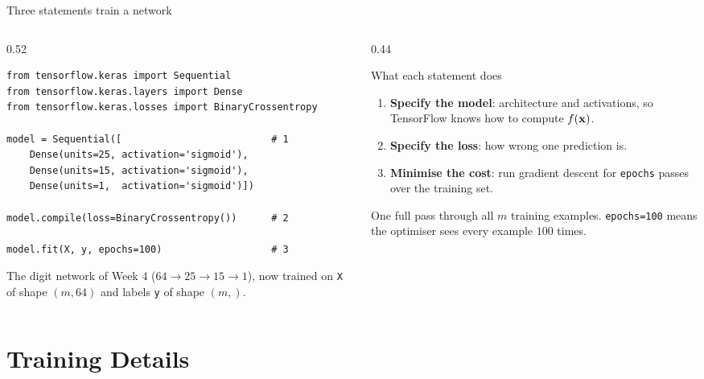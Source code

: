 \documentclass[aspectratio=169,10pt]{beamer}
\begin{document}
\begin{frame}[fragile]{Three statements train a network}
  \begin{columns}[T,onlytextwidth]
    \begin{column}{0.52\textwidth}
\begin{lstlisting}
from tensorflow.keras import Sequential
from tensorflow.keras.layers import Dense
from tensorflow.keras.losses import BinaryCrossentropy

model = Sequential([                          # 1
    Dense(units=25, activation='sigmoid'),
    Dense(units=15, activation='sigmoid'),
    Dense(units=1,  activation='sigmoid')])

model.compile(loss=BinaryCrossentropy())      # 2

model.fit(X, y, epochs=100)                   # 3
\end{lstlisting}
      \vspace{1mm}
      \footnotesize
      The digit network of Week 4 ($64\to25\to15\to1$), now trained on \texttt{X} of shape
      $(m, 64)$ and labels \texttt{y} of shape $(m,)$.
    \end{column}
    \begin{column}{0.44\textwidth}
      \footnotesize
      \begin{block}{What each statement does}
        \begin{enumerate}
          \item \textbf{Specify the model}: architecture and activations, so TensorFlow
                knows how to compute $f(\mathbf{x})$.
          \item \textbf{Specify the loss}: how wrong one prediction is.
          \item \textbf{Minimise the cost}: run gradient descent for \texttt{epochs}
                passes over the training set.
        \end{enumerate}
      \end{block}
      \begin{defnbox}[Epoch]
        \small One full pass through all $m$ training examples. \texttt{epochs=100} means
        the optimiser sees every example $100$ times.
      \end{defnbox}
    \end{column}
  \end{columns}
\end{frame}

\section{Training Details}
\end{document}
